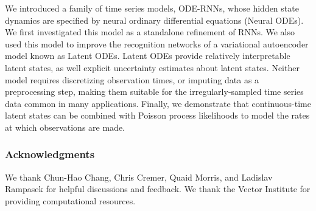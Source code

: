 \documentclass{article}
\begin{document}
We introduced a family of time series models, ODE-RNNs, whose hidden state dynamics are specified by neural ordinary differential equations (Neural ODEs).
We first investigated this model as a standalone refinement of RNNs.
We also used this model to improve the recognition networks of a variational autoencoder model known as Latent ODEs.
Latent ODEs provide relatively interpretable latent states, as well explicit uncertainty estimates about latent states.
Neither model requires discretizing observation times, or imputing data as a preprocessing step, making them suitable for the irregularly-sampled time series data common in many applications. 
Finally, we demonstrate that continuous-time latent states can be combined with Poisson process likelihoods to model the rates at which observations are made.


















\subsubsection*{Acknowledgments}

We thank Chun-Hao Chang, Chris Cremer, Quaid Morris, and Ladislav Rampasek for helpful discussions and feedback.
We thank the Vector Institute for providing computational resources.


\small {}
\end{document}
